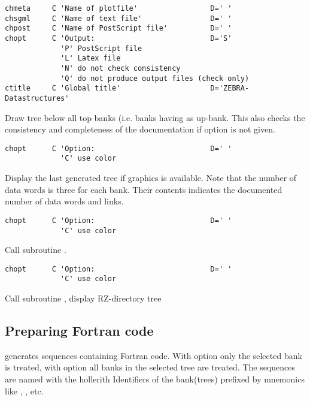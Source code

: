  
\begin{verbatim}
chmeta     C 'Name of plotfile'                 D=' '
chsgml     C 'Name of text file'                D=' '
chpost     C 'Name of PostScript file'          D=' '
chopt      C 'Output:                           D='S'
             'P' PostScript file
             'L' Latex file
             'N' do not check consistency
             'Q' do not produce output files (check only)
ctitle     C 'Global title'                     D='ZEBRA-Datastructures'
\end{verbatim}
 
Draw tree below all top banks (i.e. banks having  as
up-bank. This also checks the consistency and completeness
of the documentation if option  is not given.
 
\begin{verbatim}
chopt      C 'Option:                           D=' ' 
             'C' use color
\end{verbatim}
 
Display the last generated tree if graphics is available. 
Note that the number of data words is three for each bank. 
Their
contents indicates the documented number of data words and links.
 
\begin{verbatim}
chopt      C 'Option:                           D=' ' 
             'C' use color
\end{verbatim}
 
Call subroutine .
 
\begin{verbatim}
chopt      C 'Option:                           D=' ' 
             'C' use color
\end{verbatim}
 
Call subroutine , display RZ-directory tree
 
\subsection{Preparing Fortran code}
\label{sec:makecode}
 
 generates   sequences 
containing Fortran code.  
With option  only the selected bank is treated, 
with option  all banks in the selected tree are treated. 
The  sequences are named
with the hollerith Identifiers of the bank(trees) prefixed by mnemonics
like , ,  etc.
 
